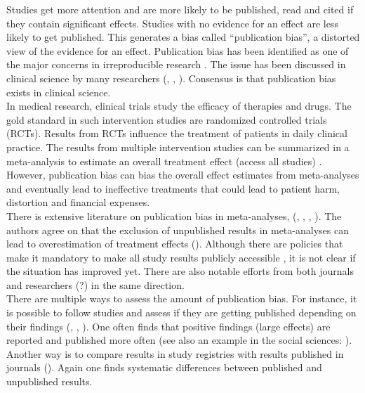 \documentclass[11pt,a4paper,twoside]{book}\usepackage[]{graphicx}\usepackage[]{color}
\begin{document}
Studies get more attention and are more likely to be published, read and cited if they contain significant effects. Studies with no evidence for an effect are less likely to get published. This generates a bias called ``publication bias'', a distorted view of the evidence for an effect. Publication bias has been identified as one of the major concerns in irreproducible research \citep{Bishop.2019}. The issue has been discussed in clinical science by many researchers (\citet{pb.clinicalscience1}, \citet{sterne2001}, \citet{Dwan2013}). Consensus is that publication bias exists in clinical science. \\
In medical research, clinical trials study the efficacy of therapies and drugs. The gold standard in such intervention studies are randomized controlled trials (RCTs). Results from RCTs influence the treatment of patients in daily clinical practice. The results from multiple intervention studies can be summarized in a meta-analysis to estimate an overall treatment effect (access all studies) \citep{Cochran}. However, publication bias can bias the overall effect estimates from meta-analyses and eventually lead to ineffective treatments that could lead to patient harm, distortion and financial expenses. \\
There is extensive literature on publication bias in meta-analyses, \eg (\citet{pb.clinicalscience.2013}, %
\citet{grey.literature.4}, \citet{grey.literature.3}, \citet{grey.literature.2}).
The authors agree on that the exclusion of unpublished results in meta-analyses can lead to overestimation of treatment effects (\eg \citet{Egger}). Although there are policies that make it mandatory to make all study results publicly accessible \citep{fda}, it is not clear if the situation has improved yet. There are also notable efforts from both journals \citep{Abbasi.2004} and researchers (?) in the same direction.\\
There are multiple ways to assess the amount of publication bias. For instance, it is possible to follow studies and assess if they are getting published depending on their findings (\citet{Dwan2013}, \citet{publication.fate}, \citet{Lee.2008}). One often finds that positive findings (\ie large effects) are reported and published more often (see also an example in the social sciences: \citet{social.sciences.publication.bias}). Another way is to compare results in study registries with results published in journals (\eg \citet{pb.clinicalscience.2013}). Again one finds systematic differences between published and unpublished results. \\
\end{document}
